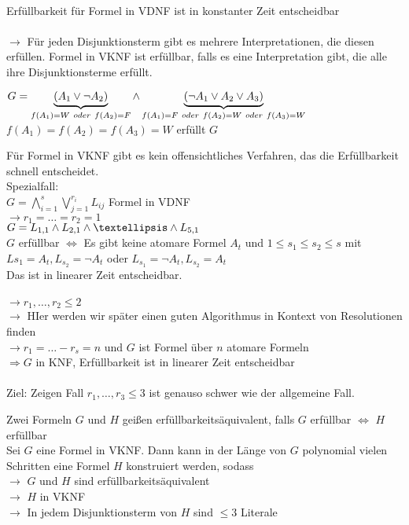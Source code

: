 \noindent\\
Erfüllbarkeit für Formel in VDNF ist in konstanter Zeit entscheidbar\\

\noindent\\
$\rightarrow$ Für jeden Disjunktionsterm gibt es mehrere Interpretationen, die diesen erfüllen. Formel in VKNF ist erfüllbar, falls es eine Interpretation gibt, die alle ihre Disjunktionsterme erfüllt.

\beispiel{}
$G = \underbrace{ (A_1 \vee \neg A_2) }_{f(A_1) = W \ oder \ f(A_2) = F} \wedge \underbrace{ ( \neg A_1 \vee A_2 \vee A_3) }_{f(A_1) = F\ oder\ f(A_2)=W\ oder\ f(A_3) = W}$\\
$f(A_1) = f(A_2) = f(A_3) = W$ erfüllt $G$

\bemerkung{}
Für Formel in VKNF gibt es kein offensichtliches Verfahren, das die Erfüllbarkeit schnell entscheidet.\\
Spezialfall:\\
$G = \bigwedge_{i=1}^s \bigvee_{j=1}^{r_i} L_{ij}$ Formel in VDNF\\
$\rightarrow r_1 = … = r_2 = 1$\\
$G = L_{1,1} \AND L_{2,1} \AND … \AND L_{5,1}$\\
$G$ erfüllbar $\Leftrightarrow$ Es gibt keine atomare Formel $A_t$ und $1 \leq s_1 \leq s_2 \leq s$ mit $L{s_1} = A_t, L_{s_2} = \neg A_t$ oder $L_{s_1} = \neg A_t, L_{s_2} = A_t$\\
Das ist in linearer Zeit entscheidbar.\\

\noindent\\
$\rightarrow r_1, …, r_2 \leq 2$\\
$\rightarrow$ HIer werden wir später einen guten Algorithmus in Kontext von Resolutionen finden\\
$\rightarrow r_1 = … - r_s = n$ und $G$ ist Formel über $n$ atomare Formeln\\
$\Rightarrow G$ in KNF, Erfüllbarkeit ist in linearer Zeit entscheidbar\\

\noindent\\
Ziel: Zeigen Fall $r_1, …, r_3 \leq 3$ ist genauso schwer wie der allgemeine Fall.

Zwei Formeln $G$ und $H$ geißen erfüllbarkeitsäquivalent, falls $G$ erfüllbar $\Leftrightarrow$ $H$ erfüllbar\\

Sei $G$ eine Formel in VKNF. Dann kann in der Länge von $G$ polynomial vielen Schritten eine Formel $H$ konstruiert werden, sodass \\
$\rightarrow$ $G$ und $H$ sind erfüllbarkeitsäquivalent\\
$\rightarrow$ $H$ in VKNF\\
$\rightarrow$ In jedem Disjunktionsterm von $H$ sind $\leq 3$ Literale

